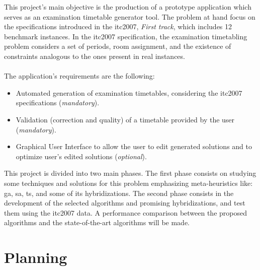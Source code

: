 This project's main objective is the production of a prototype application which serves as an examination timetable generator tool. The problem at hand focus on the specifications introduced in the \gls{itc2007}, \textit{First track}, which includes 12 benchmark instances. In the \gls{itc2007} specification, the examination timetabling problem considers a set of periods, room assignment, and the existence of constraints analogous to the ones present in real instances.\\
\\
The application's requirements are the following:
\begin{itemize}
	\item Automated generation of examination timetables, considering the \gls{itc2007} specifications (\textit{mandatory}).
	\item Validation (correction and quality) of a timetable provided by the user (\textit{mandatory}).
	\item Graphical User Interface to allow the user to edit generated solutions and to optimize user's edited solutions (\textit{optional}).
\end{itemize}
This project is divided into two main phases. The first phase consists on studying some techniques and solutions for this problem emphasizing meta-heuristics like: \gls{ga}, \gls{sa}, \gls{ts}, and some of its hybridizations. The second phase consists in the development of the selected algorithms and promising hybridizations, and test them using the \gls{itc2007} data. A performance comparison between the proposed algorithms and the state-of-the-art algorithms will be made.

\section{Planning}

